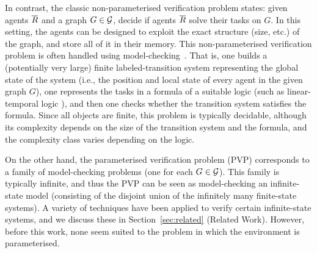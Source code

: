 In contrast, the classic non-parameterised verification problem states: given agents $\overline{R}$ and a graph $G \in \mathcal{G}$, decide if agents $\overline{R}$ solve their tasks on $G$. In this setting, the agents can be designed to exploit the exact structure (size, etc.) of the graph, and store all of it in their memory.
This non-parameterised verification problem is often handled using model-checking~\cite{CGP1999}.  That is, one builds a (potentially very large) finite labeled-transition system representing the global state of the system (i.e., the position and local state of every agent in the given graph $G$), one represents the tasks in a formula of a suitable logic (such as linear-temporal logic \LTL), and then one checks whether the transition system satisfies the formula. Since all objects are finite, this problem is typically decidable, although its complexity depends on the size of the transition system and the formula, and the complexity class varies depending on the logic.

On the other hand, the parameterised verification problem (PVP) corresponds to a family of model-checking problems (one for each $G \in \mathcal{G}$). This family is typically infinite, and thus the PVP can be seen as model-checking an infinite-state model (consisting of the disjoint union of the infinitely many finite-state systems). A variety of techniques have been applied to verify certain infinite-state systems, and we discuss these in Section~\ref{sec:related} (Related Work). However, before this work, none seem suited to the problem in which the environment is parameterised.







